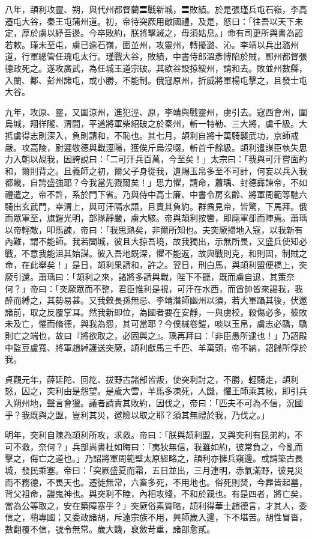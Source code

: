 \begin{pinyinscope}
 八年，頡利攻靈、朔，與代州都督藺〓戰新城，〓敗績。於是張瑾兵屯石嶺，李高遷屯大谷，秦王屯蒲州道。初，帝待突厥用敵國禮，及是，怒曰：「往吾以天下未定，厚於虜以紓吾邊。今卒敗約，朕將擊滅之，毋須姑息。」命有司更所與書為詔若敕。瑾未至屯，虜已逾石嶺，圍並州，攻靈州，轉擾潞、沁。李靖以兵出潞州道，行軍總管任瑰屯太行。瑾戰大谷，敗績，中書侍郎溫彥博陷於賊，鄆州都督張德政死之。遂攻廣武，為任城王道宗破。其欲谷設掠綏州，請和去。敗並州數縣，入蘭、鄯、彭州諸屯，或小勝，不能制。俄寇原州，折威將軍楊屯擊之，且發士屯大谷。



 九年，攻原、靈，又圍涼州，進犯涇、原，李靖與戰靈州，虜引去。寇西會州，圍烏城，翔徉隴、渭間，平道將軍柴紹破之於秦州，斬一特勒、三大將，虜千級。大抵虜得志則深入，負則請和，不恥也。其七月，頡利自將十萬騎襲武功，京師戒嚴。攻高陵，尉遲敬德與戰涇陽，獲俟斤烏沒啜，斬首千餘級。頡利遣謀臣執失思力入朝以覘我，因誇說曰：「二可汗兵百萬，今至矣！」太宗曰：「我與可汗嘗面約和，爾則背之。且義師之初，爾父子身從我，遺賜玉帛多至不可計，何妄以兵入我都畿，自誇盛強耶？今我當先戮爾矣！」思力懼，請命，蕭瑀、封德彞諫帝，不如禮遣之，帝不許，系於門下省。乃與侍中高士廉、中書令房玄齡、將軍周範等馳六騎出玄武門，幸渭上，與可汗隔水語，且責其負約。群酋見帝，皆驚，下馬拜。俄而眾軍至，旗鎧光明，部隊靜嚴，虜大駭。帝與頡利按轡，即麾軍卻而陣焉。蕭瑀以帝輕敵，叩馬諫，帝曰：「我思熟矣，非爾所知也。夫突厥掃地入寇，以我新有內難，謂不能師。我若闔城，彼且大掠吾境，故我獨出，示無所畏，又盛兵使知必戰，不意我能沮其始謀。彼入吾地既深，懼不能返，故與戰則克，和則固，制賊之命，在此舉矣！」是日，頡利果請和，許之。翌日，刑白馬，與頡利盟便橋上，突厥引還。蕭瑀曰：「頡利之來，諸將多請與戰，陛下不聽，既而虜自退，其策奈何？」帝曰：「突厥眾而不整，君臣惟利是視，可汗在水西，而酋帥皆來謁我，我醉而縛之，其勢易甚。又我敕長孫無忌、李靖潛師幽州以須，若大軍躡其後，伏邀諸前，取之反覆掌耳。然我新即位，為國者要在安靜，一與虜校，殺傷必多，彼敗未及亡，懼而脩德，與我為怨，其可當耶？今僕械卷鎧，啖以玉帛，虜志必驕，驕則亡之端也，故曰『將欲取之，必固與之』。瑀再拜曰：「非臣愚所逮也！」乃詔殿中監豆盧寬、將軍趙綽護送突厥，頡利獻馬三千匹、羊萬頭，帝不納，詔歸所俘於我。



 貞觀元年，薛延陀、回紇、拔野古諸部皆叛，使突利討之，不勝，輕騎走，頡利怒，囚之，突利由是怨望。是歲大雪，羊馬多凍死，人饑，懼王師乘其敝，即引兵入朔州地，聲言會獵。議者請責其敗約，因伐之，帝曰：「匹夫不可為不信，況國乎？我既與之盟，豈利其災，邀險以取之耶？須其無禮於我，乃伐之。」



 明年，突利自陳為頡利所攻，求救。帝曰：「朕與頡利盟，又與突利有昆弟約，不可不救，奈何？」兵部尚書杜如晦曰：「夷狄無信，我雖如約，彼常負之，今亂而擊之，侮亡之道也。」乃詔將軍周範壁太原經略之，頡利亦擁兵窺邊。或請築古長城，發民乘塞。帝曰：「突厥盛夏而霜，五日並出，三月連明，赤氣滿野，彼見災而不務德，不畏天也。遷徙無常，六畜多死，不用地也。俗死則焚，今葬皆起墓，背父祖命，謾鬼神也。與突利不睦，內相攻殘，不和於親也。有是四者，將亡矣，當為公等取之，安在築障塞乎？」突厥俗素質略，頡利得華士趙德言，才其人，委信之，稍專國；又委政諸胡，斥遠宗族不用，興師歲入邊，下不堪苦。胡性冒沓，數翻覆不信，號令無常。歲大饑，裒斂苛重，諸部愈貳。




\end{pinyinscope}

